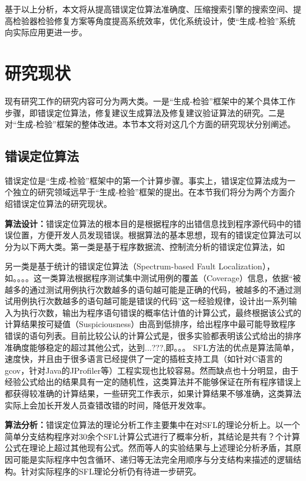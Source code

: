 基于以上分析，本文将从提高错误定位算法准确度、压缩搜索引擎的搜索空间、提高检验器检验修复方案等角度提高系统效率，优化系统设计，使“生成-检验”系统向实际应用更进一步。

\section{研究现状}%

现有研究工作的研究内容可分为两大类。一是“生成-检验”框架中的某个具体工作步骤，即错误定位算法，修复建议生成算法及修复建议验证算法的研究。二是对“生成-检验”框架的整体改进。本节本文将对这几个方面的研究现状分别阐述。
\subsection{错误定位算法}
错误定位是“生成-检验”框架中的第一个计算步骤。事实上，错误定位算法成为一个独立的研究领域远早于“生成-检验”框架的提出。在本节我们将分为两个方面介绍错误定位算法的研究现状。

\textbf{算法设计：}错误定位算法的根本目的是根据程序的出错信息找到程序源代码中的错误位置，方便开发人员发现错误。根据算法的基本思想，现有的错误定位算法可以分为以下两大类。第一类是基于程序数据流、控制流分析的错误定位算法，如\cite{}

另一类是基于统计的错误定位算法（Spectrum-based Fault Localization），如。。。。这一类算法根据程序测试集中测试用例的覆盖（Coverage）信息，依据“被越多的通过测试用例执行次数越多的语句越可能是正确的代码，被越多的不通过测试用例执行次数越多的语句越可能是错误的代码”这一经验规律，设计出一系列输入为执行次数，输出为程序语句错误的概率估计值的计算公式，最终根据该公式的计算结果按可疑值（Suspiciousness）由高到低排序，给出程序中最可能导致程序错误的语句列表。目前比较公认的计算公式是\cite{Ochiai}，很多实验\cite{sss}都表明该公式给出的排序准确度能够稳定的超过其他公式，达到...???,即。。。
SFL方法的优点是算法简单，速度快，并且由于很多语言已经提供了一定的插桩支持工具（如针对C语言的gcov，针对Java的JProfiler等）工程实现也比较容易。然而缺点也十分明显，由于经验公式给出的结果具有一定的随机性，这类算法并不能够保证在所有程序错误上都获得较准确的计算结果，一些研究工作表示，如果计算结果不够准确，这类算法实际上会加长开发人员查错改错的时间，降低开发效率。

\textbf{算法分析：}错误定位算法的理论分析工作主要集中在对SFL的理论分析上。\cite{ss}以一个简单分支结构程序对30余个SFL计算公式进行了概率分析，其结论是共有？个计算公式在理论上超过其他现有公式。然而\cite{}等人的实验结果与上述理论分析矛盾，其原因可能是实际程序中包含循环、递归等无法完全用顺序与分支结构来描述的逻辑结构。针对实际程序的SFL理论分析仍有待进一步研究。


